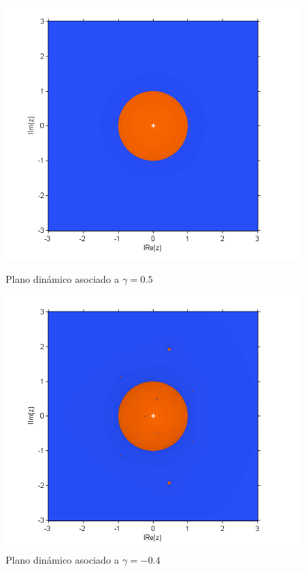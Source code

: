\begin{figure}[h!!!]
	\begin{minipage}[m]{0.5\linewidth}%
		\centering \includegraphics[width=\linewidth]{redpoint3.png}
		\caption{Plano dinámico asociado a $\gamma=0.5$}\label{estable3}
	\end{minipage}
	\begin{minipage}[m]{0.5\linewidth}%
		\centering \includegraphics[width=\linewidth]{redpoint4.png}
		\caption{Plano dinámico asociado a $\gamma=-0.4$}\label{estable4}
	\end{minipage}
\end{figure}

